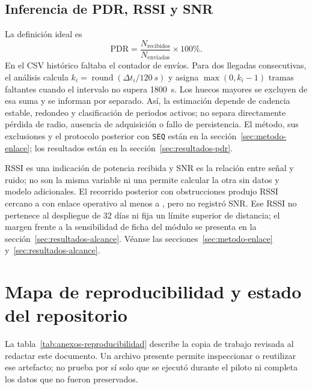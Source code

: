 \subsection{Inferencia de PDR, RSSI y SNR}

La definición ideal es
\begin{equation}
\mathrm{PDR}=\frac{N_{\mathrm{recibidos}}}{N_{\mathrm{enviados}}}\times100\%.
\label{eq:anexo-pdr}
\end{equation}
En el CSV histórico faltaba el contador de envíos. Para dos llegadas consecutivas, el análisis calcula $k_i=\operatorname{round}(\Delta t_i/120~s)$ y asigna $\max(0,k_i-1)$ tramas faltantes cuando el intervalo no supera 1800~s. Los huecos mayores se excluyen de esa suma y se informan por separado. Así, la estimación \PDREstimado{} depende de cadencia estable, redondeo y clasificación de periodos activos; no separa directamente pérdida de radio, ausencia de adquisición o fallo de persistencia. El método, sus exclusiones y el protocolo posterior con \texttt{SEQ} están en la sección~\ref{sec:metodo-enlace}; los resultados están en la sección~\ref{sec:resultados-pdr}.

RSSI es una indicación de potencia recibida y SNR es la relación entre señal y ruido; no son la misma variable ni una permite calcular la otra sin datos y modelo adicionales. El recorrido posterior con obstrucciones produjo RSSI cercano a \RSSILejano{} con enlace operativo al menos a \DistanciaDemostrada{}, pero no registró SNR. Ese RSSI no pertenece al despliegue de 32 días ni fija un límite superior de distancia; el margen frente a la sensibilidad de ficha del módulo se presenta en la sección~\ref{sec:resultados-alcance}. Véanse las secciones~\ref{sec:metodo-enlace} y~\ref{sec:resultados-alcance}.

\section{Mapa de reproducibilidad y estado del repositorio}
\label{sec:anexos-reproducibilidad}

La tabla~\ref{tab:anexos-reproducibilidad} describe la copia de trabajo revisada al redactar este documento. Un archivo presente permite inspeccionar o reutilizar ese artefacto; no prueba por sí solo que se ejecutó durante el piloto ni completa los datos que no fueron preservados.

